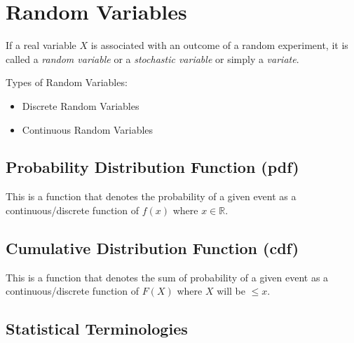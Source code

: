 \documentclass[./EngineeringMaths.tex]{subfiles}
\begin{document}
\section[Random Variables]{Random Variables}

If a real variable $X$ is associated with an outcome of a random experiment, it is called a \textit{random variable} or a \textit{stochastic variable} or simply a \textit{variate}.


Types of Random Variables:

\begin{itemize}
\item Discrete Random Variables
\item Continuous Random Variables
\end{itemize}

\subsection[Probability Distribution Function]{Probability Distribution Function (pdf)}
This is a function that denotes the probability of a given event as a continuous/discrete function of $f(x)$ where $x \in \mathbb{R}$.

\subsection[Cumulative Distribution Function]{Cumulative Distribution Function (cdf)}
This is a function that denotes the sum of probability of a given event as a continuous/discrete function of $F(X)$ where $X$ will be $ \leq x$.

\subsection{Statistical Terminologies}
\end{document}
